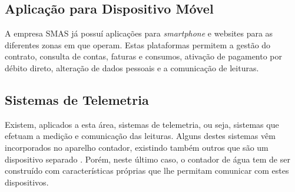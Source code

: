 \subsection{Aplicação para Dispositivo Móvel}
A empresa SMAS já possuí aplicações para \textit{smartphone} \cite{smas:almada} e websites \cite{smas:sintra} para as diferentes zonas em que operam. Estas plataformas permitem a gestão do contrato, consulta de contas, faturas e consumos, ativação de pagamento por débito direto, alteração de dados pessoais e a comunicação de leituras.

\subsection{Sistemas de Telemetria}
Existem, aplicados a esta área, sistemas de telemetria, ou seja, sistemas que efetuam a medição e comunicação das leituras. Alguns destes sistemas vêm incorporados no aparelho contador, existindo também outros que são um dispositivo separado \cite{janz:impji}. Porém, neste último caso, o contador de água tem de ser construído com características próprias que lhe permitam comunicar com estes dispositivos.
